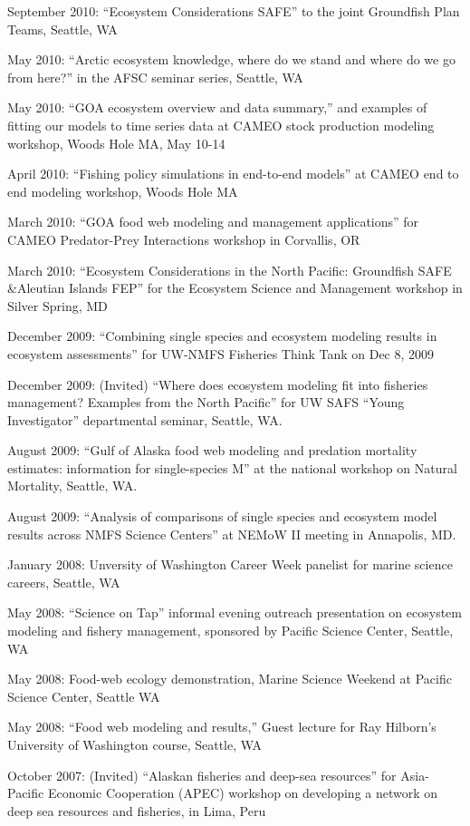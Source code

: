 \documentclass[11pt, a4paper]{awesome-cv}
\begin{document}
September 2010: ``Ecosystem Considerations SAFE'' to the joint
Groundfish Plan Teams, Seattle, WA

May 2010: ``Arctic ecosystem knowledge, where do we stand and where do
we go from here?'' in the AFSC seminar series, Seattle, WA

May 2010: ``GOA ecosystem overview and data summary,'' and examples of
fitting our models to time series data at CAMEO stock production
modeling workshop, Woods Hole MA, May 10-14

April 2010: ``Fishing policy simulations in end-to-end models'' at CAMEO
end to end modeling workshop, Woods Hole MA

March 2010: ``GOA food web modeling and management applications'' for
CAMEO Predator-Prey Interactions workshop in Corvallis, OR

March 2010: ``Ecosystem Considerations in the North Pacific: Groundfish
SAFE \&Aleutian Islands FEP'' for the Ecosystem Science and Management
workshop in Silver Spring, MD

December 2009: ``Combining single species and ecosystem modeling results
in ecosystem assessments'' for UW-NMFS Fisheries Think Tank on Dec 8,
2009

December 2009: (Invited) ``Where does ecosystem modeling fit into
fisheries management? Examples from the North Pacific'' for UW SAFS
``Young Investigator'' departmental seminar, Seattle, WA.

August 2009: ``Gulf of Alaska food web modeling and predation mortality
estimates: information for single-species M'' at the national workshop
on Natural Mortality, Seattle, WA.

August 2009: ``Analysis of comparisons of single species and ecosystem
model results across NMFS Science Centers'' at NEMoW II meeting in
Annapolis, MD.

January 2008: Unversity of Washington Career Week panelist for marine
science careers, Seattle, WA

May 2008: ``Science on Tap'' informal evening outreach presentation on
ecosystem modeling and fishery management, sponsored by Pacific Science
Center, Seattle, WA

May 2008: Food-web ecology demonstration, Marine Science Weekend at
Pacific Science Center, Seattle WA

May 2008: ``Food web modeling and results,'' Guest lecture for Ray
Hilborn's University of Washington course, Seattle, WA

October 2007: (Invited) ``Alaskan fisheries and deep-sea resources'' for
Asia-Pacific Economic Cooperation (APEC) workshop on developing a
network on deep sea resources and fisheries, in Lima, Peru
\end{document}
